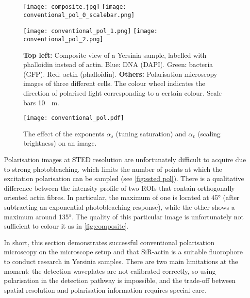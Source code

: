 \begin{figure}
	\centering
	\newlength{\spacing}
	\setlength{\spacing}{7pt}
	
	\texttt{[image: composite.jpg]}%
	\hspace{\spacing}%
	\texttt{[image: conventional\_pol\_0\_scalebar.png]}
	
	\vspace{\spacing}
	
	\texttt{[image: conventional\_pol\_1.png]}%
	\hspace{\spacing}%
	\texttt{[image: conventional\_pol\_2.png]}
	
	\caption{
		\textbf{Top left:} Composite view of a Yersinia sample, labelled with phalloidin instead of actin. Blue: DNA (DAPI). Green: bacteria (GFP). Red: actin (phalloidin).
		\textbf{Others:} Polarisation microscopy images of three different cells. The colour wheel indicates the direction of polarised light corresponding to a certain colour. Scale bars \SI{10}{\mu m}.
	}
	\label{fig:composite}
\end{figure}

\begin{figure}
	\centering
	\texttt{[image: conventional\_pol.pdf]}
	\caption{
		The effect of the exponents $ \alpha_s $ (tuning saturation) and $ \alpha_v $ (scaling brightness) on an image.
	}
	\label{fig:power law exponents}
\end{figure}

Polarisation images at STED resolution are unfortunately difficult to acquire due to strong photobleaching, which limits the number of points at which the excitation polarisation can be sampled (see \autoref{fig:ssted pol}). There is a qualitative difference between the intensity profile of two ROIs that contain orthogonally oriented actin fibres. In particular, the maximum of one is located at \ang{45} (after subtracting an exponential photobleaching response), while the other shows a maximum around \ang{135}. The quality of this particular image is unfortunately not sufficient to colour it as in \autoref{fig:composite}.

In short, this section demonstrates successful conventional polarisation microscopy on the microscope setup and that SiR-actin is a suitable fluorophore to conduct research in Yersinia samples. There are two main limitations at the moment: the detection waveplates are not calibrated correctly, so using polarisation in the detection pathway is impossible, and the trade-off between spatial resolution and polarisation information requires special care.



